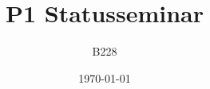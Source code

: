 \begin{titlepage}
\title{P1 Statusseminar}
\author{B228}
\date{\today}
\pagebreak
\maketitle
\end{titlepage}